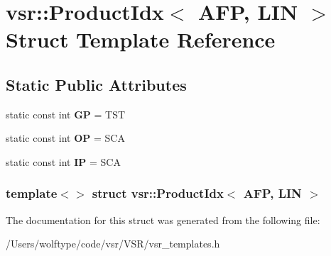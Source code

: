 \hypertarget{structvsr_1_1_product_idx_3_01_a_f_p_00_01_l_i_n_01_4}{\section{vsr\-:\-:Product\-Idx$<$ A\-F\-P, L\-I\-N $>$ Struct Template Reference}
\label{structvsr_1_1_product_idx_3_01_a_f_p_00_01_l_i_n_01_4}
}
\subsection*{Static Public Attributes}
\begin{DoxyCompactItemize}
\item 
\hypertarget{structvsr_1_1_product_idx_3_01_a_f_p_00_01_l_i_n_01_4_ac39ffafe33607fa152a2fa81d2c10e77}{static const int {\bfseries G\-P} = T\-S\-T}\label{structvsr_1_1_product_idx_3_01_a_f_p_00_01_l_i_n_01_4_ac39ffafe33607fa152a2fa81d2c10e77}

\item 
\hypertarget{structvsr_1_1_product_idx_3_01_a_f_p_00_01_l_i_n_01_4_aa47d9b6a227e094aa2f5f3a21cd0451e}{static const int {\bfseries O\-P} = S\-C\-A}\label{structvsr_1_1_product_idx_3_01_a_f_p_00_01_l_i_n_01_4_aa47d9b6a227e094aa2f5f3a21cd0451e}

\item 
\hypertarget{structvsr_1_1_product_idx_3_01_a_f_p_00_01_l_i_n_01_4_af2ad7b1d729a6d3b0dc2160893388d48}{static const int {\bfseries I\-P} = S\-C\-A}\label{structvsr_1_1_product_idx_3_01_a_f_p_00_01_l_i_n_01_4_af2ad7b1d729a6d3b0dc2160893388d48}

\end{DoxyCompactItemize}
\subsubsection*{template$<$$>$ struct vsr\-::\-Product\-Idx$<$ A\-F\-P, L\-I\-N $>$}



The documentation for this struct was generated from the following file\-:\begin{DoxyCompactItemize}
\item 
/\-Users/wolftype/code/vsr/\-V\-S\-R/vsr\-\_\-templates.\-h\end{DoxyCompactItemize}
